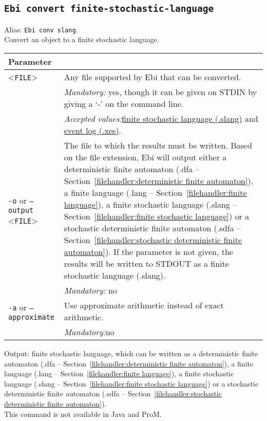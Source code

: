 {\subsection{\texttt{Ebi convert finite-stochastic-language}}
\label{command:Ebi convert finite-stochastic-language}
Alias: \texttt{Ebi conv slang}.\\
Convert an object to a finite stochastic language.\\
\begin{tabularx}{\linewidth}{lX}
\toprule
Parameter \\\midrule
<\texttt{FILE}>&Any file supported by Ebi that can be converted.\\
&\textit{Mandatory:} \quad yes, though it can be given on STDIN by giving a `-' on the command line.\\
&\textit{Accepted values:}\quad \hyperref[filehandler:finite stochastic language]{finite stochastic language (.slang)} and \hyperref[filehandler:event log]{event log (.xes)}.\\
\texttt{-o} or \texttt{--output} <\texttt{FILE}> &
The file to which the results must be written. Based on the file extension, Ebi will output either a deterministic finite automaton (.dfa -- Section~\ref{filehandler:deterministic finite automaton}), a finite language (.lang -- Section~\ref{filehandler:finite language}), a finite stochastic language (.slang -- Section~\ref{filehandler:finite stochastic language}) or a stochastic deterministic finite automaton (.sdfa -- Section~\ref{filehandler:stochastic deterministic finite automaton}).
If the parameter is not given, the results will be written to STDOUT as a finite stochastic language (.slang).\\
&\textit{Mandatory:} \quad no\\
\texttt{-a} or \texttt{--approximate} & Use approximate arithmetic instead of exact arithmetic.\\
&\textit{Mandatory:}\quad no\\
\bottomrule
\end{tabularx}
\noindent Output: finite stochastic language, which can be written as a deterministic finite automaton (.dfa -- Section~\ref{filehandler:deterministic finite automaton}), a finite language (.lang -- Section~\ref{filehandler:finite language}), a finite stochastic language (.slang -- Section~\ref{filehandler:finite stochastic language}) or a stochastic deterministic finite automaton (.sdfa -- Section~\ref{filehandler:stochastic deterministic finite automaton}).
\\This command is not available in Java and ProM.
}
